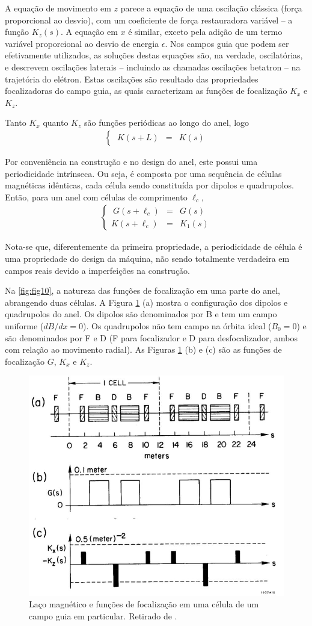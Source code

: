A equação de movimento em $z$ parece a equação de uma oscilação clássica (força proporcional ao desvio), com um coeficiente de força restauradora variável -- a função $K_z(s)$. A equação em $x$ é similar, exceto pela adição de um termo variável proporcional ao desvio de energia $\epsilon$. Nos campos guia que podem ser efetivamente utilizados, as soluções destas equações são, na verdade, oscilatórias, e descrevem oscilações laterais -- incluindo as chamadas oscilações betatron -- na trajetória do elétron. Estas oscilações são resultado das propriedades focalizadoras do campo guia, as quais caracterizam as funções de focalização $K_x$ e $K_z$.

Tanto $K_x$ quanto $K_z$ são funções periódicas ao longo do anel, logo
\begin{align}
	\left\{\begin{array}{rcl}
	\ K(s+L) & = & K(s)
	\end{array}\right.
\end{align}

Por conveniência na construção e no design do anel, este possui uma periodicidade intrínseca. Ou seja, é composta por uma sequência de células magnéticas idênticas, cada célula sendo constituída por dipolos e quadrupolos. Então, para um anel com células de comprimento $\ell_c$,
\begin{align}
	\left\{\begin{array}{rcl}
	\ G(s+\ell_c) & = & G(s)\\
	K(s+\ell_c) & = & K_1(s)
	\end{array}\right.
\end{align}

Nota-se que, diferentemente da primeira propriedade, a periodicidade de célula é uma propriedade do design da máquina, não sendo totalmente verdadeira em campos reais devido a imperfeições na construção.

Na \autoref{fig:fig10}, a natureza das funções de focalização em uma parte do anel, abrangendo duas células. A Figura \ref{fig:fig10} (a) mostra o configuração dos dipolos e quadrupolos do anel. Os dipolos são denominados por B e tem um campo uniforme ($dB/dx = 0$). Os quadrupolos não tem campo na órbita ideal ($B_0=0$) e são denominados por F e D (F para focalizador e D para desfocalizador, ambos com relação ao movimento radial). As Figuras \ref{fig:fig10} (b) e (c) são as funções de focalização $G$, $K_x$ e $K_z$.

\begin{figure}[!htb]
	\centering
	\includegraphics[width=0.7\linewidth]{./Figuras/fig10.jpeg}
	\caption{Laço magnético e funções de focalização em uma célula de um campo guia em particular. Retirado de \cite{sands1970physics}.}
	\label{fig:fig10}
\end{figure}